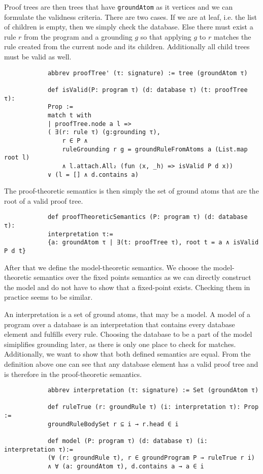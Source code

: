 \documentclass{article}
\begin{document}
        Proof trees are then trees that have \texttt{groundAtom} as it vertices and we can formulate the validness criteria. There are two cases. If we are at leaf, i.e. the list of children is empty, then we simply check the database. Else there must exist a rule $r$ from the program and a grounding $g$ so that applying $g$ to $r$ matches the rule created from the current node and its children. Additionally all child trees must be valid as well.

        \begin{lstlisting}
            abbrev proofTree' (τ: signature) := tree (groundAtom τ)

            def isValid(P: program τ) (d: database τ) (t: proofTree τ): 
            Prop :=
            match t with
            | proofTree.node a l => 
            ( ∃(r: rule τ) (g:grounding τ), 
                r ∈ P ∧ 
                ruleGrounding r g = groundRuleFromAtoms a (List.map root l)
                ∧ l.attach.All₂ (fun ⟨x, _h⟩ => isValid P d x)) 
            ∨ (l = [] ∧ d.contains a)
        \end{lstlisting}

        The proof-theoretic semantics is then simply the set of ground atoms that are the root of a valid proof tree.

        \begin{lstlisting}
            def proofTheoreticSemantics (P: program τ) (d: database τ): 
            interpretation τ:= 
            {a: groundAtom τ | ∃(t: proofTree τ), root t = a ∧ isValid P d t}
        \end{lstlisting}

        After that we define the model-theoretic semantics. We choose the model-theoretic semantics over the fixed points semantics as we can directly construct the model and do not have to show that a fixed-point exists. Checking them in practice seems to be similar. 

        An interpretation is a set of ground atoms, that may be a model. A model of a program over a database is an interpretation that contains every database element and fulfills every rule. Choosing the database to be a part of the model simiplifies grounding later, as there is only one place to check for matches. Additionally, we want to show that both defined semantics are equal. From the definition above one can see that any database element has a valid proof tree and is therefore in the proof-theoretic semantics.

        \begin{lstlisting}
            abbrev interpretation (τ: signature) := Set (groundAtom τ)

            def ruleTrue (r: groundRule τ) (i: interpretation τ): Prop := 
            groundRuleBodySet r ⊆ i → r.head ∈ i

            def model (P: program τ) (d: database τ) (i: interpretation τ):= 
            (∀ (r: groundRule τ), r ∈ groundProgram P → ruleTrue r i) 
            ∧ ∀ (a: groundAtom τ), d.contains a → a ∈ i
        \end{lstlisting}
\end{document}
